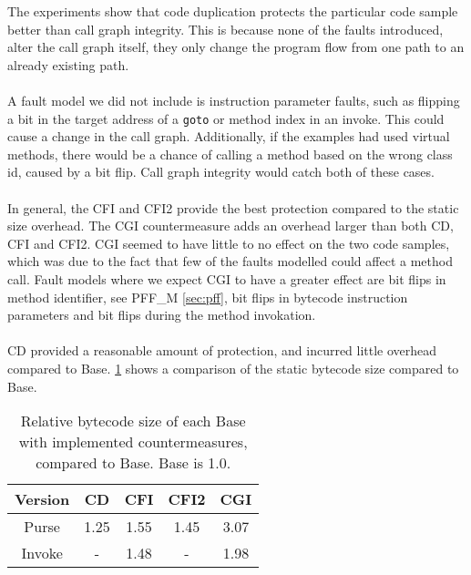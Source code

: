 The experiments show that code duplication protects the particular code sample better than call graph integrity. This is because none of the faults introduced, alter the call graph itself, they only change the program flow from one path to an already existing path.\\\\
A fault model we did not include is instruction parameter faults, such as flipping a bit in the target address of a \texttt{goto} or method index in an invoke. This could cause a change in the call graph. Additionally, if the examples had used virtual methods, there would be a chance of calling a method based on the wrong class id, caused by a bit flip. Call graph integrity would catch both of these cases.\\\\
In general, the CFI and CFI2 provide the best protection compared to the static size overhead. The CGI countermeasure adds an overhead larger than both CD, CFI and CFI2. CGI seemed to have little to no effect on the two code samples, which was due to the fact that few of the faults modelled could affect a method call. Fault models where we expect CGI to have a greater effect are bit flips in method identifier, see PFF\_M \cref{sec:pff}, bit flips in bytecode instruction parameters and bit flips during the method invokation.\\\\
CD provided a reasonable amount of protection, and incurred little overhead compared to Base. \cref{tab:staticSize} shows a comparison of the static bytecode size compared to Base.

\begin{table}[H]
\centering
\begin{tabular}{|c|c|c|c|c|}
\hline Version & CD & CFI & CFI2 & CGI \\ 
\hline Purse & 1.25 & 1.55 & 1.45 & 3.07 \\ 
\hline Invoke & - & 1.48 & - & 1.98 \\ 
\hline 
\end{tabular} 
    \caption{Relative bytecode size of each Base with implemented countermeasures, compared to Base. Base is 1.0.}
\label{tab:staticSize}
\end{table}